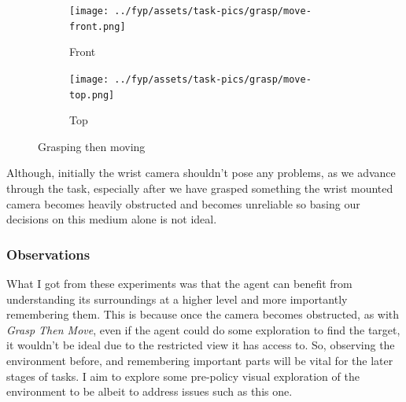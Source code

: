 \begin{figure}[htpb] %
  \centering
  \begin{subfigure}{0.45\linewidth}
    \centering
    \texttt{[image: ../fyp/assets/task-pics/grasp/move-front.png]} 
    \caption{Front}\label{subfig:grasp-move-front}
  \end{subfigure}
  \hfill
  \begin{subfigure}{0.45\linewidth}
    \centering
    \texttt{[image: ../fyp/assets/task-pics/grasp/move-top.png]}
    \caption{Top}\label{subfig:grasp-move-top}
  \end{subfigure}
  \caption{Grasping then moving}\label{fig:grasp-move}
\end{figure}



Although, initially the wrist camera shouldn't pose any problems, as we advance through the task, especially after we have grasped something the wrist mounted camera becomes heavily obstructed and becomes unreliable so basing our decisions on this medium alone is not ideal.

\subsubsection{Observations}
What I got from these experiments was that the agent can benefit from understanding its surroundings at a higher level and more importantly remembering them. This is because once the camera becomes obstructed, as with \emph{Grasp Then Move}, even if the agent could do some exploration to find the target, it wouldn't be ideal due to the restricted view it has access to. So, observing the environment before, and remembering important parts will be vital for the later stages of tasks. I aim to explore some pre-policy visual exploration of the environment to be albeit to address issues such as this one.
